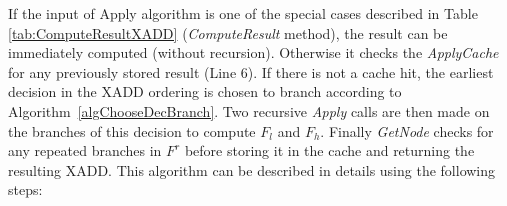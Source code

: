 \documentclass[twoside,11pt]{article}
\begin{document}
If the input of Apply algorithm is one of the special cases described in Table  \ref{tab:ComputeResultXADD} (\emph{ComputeResult} method), the result can be immediately computed (without recursion). Otherwise it checks the \emph{ApplyCache} for any previously stored result (Line 6).  If there is not a cache hit, the earliest decision in the XADD ordering is chosen to branch according to Algorithm~\ref{algChooseDecBranch}. Two recursive \emph{Apply} calls are then made on the branches of this decision to compute $F_l$ and $F_h$. Finally \emph{GetNode} checks for any repeated branches in $F^r$ before storing it in the cache and returning the resulting XADD. 
This algorithm can be described in details using the following steps:

\incmargin{0.5em}
\linesnumbered
\end{document}
